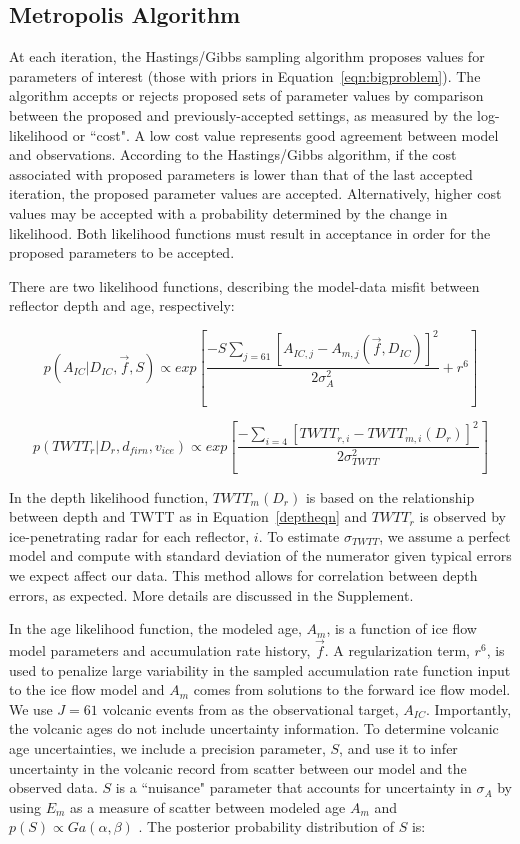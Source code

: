 \subsection{Metropolis Algorithm}\label{metrop}
At each iteration, the Hastings/Gibbs sampling algorithm \citep{hastings1970,gelfand1992} proposes values for parameters of interest (those with priors in Equation~\ref{eqn:bigproblem}). The algorithm accepts or rejects proposed sets of parameter values by comparison between the proposed and previously-accepted settings, as measured by the log-likelihood or ``cost". A low cost value represents good agreement between model and observations. According to the Hastings/Gibbs algorithm, if the cost associated with proposed parameters is lower than that of the last accepted iteration, the proposed parameter values are accepted. Alternatively, higher cost values may be accepted with a probability determined by the change in likelihood. Both likelihood functions must result in acceptance in order for the proposed parameters to be accepted.


There are two likelihood functions, describing the model-data misfit between reflector depth and age, respectively:


\begin{equation}\label{eqn:loglikeage}
p(A_{IC} | D_{IC},\vec{f},S) \propto exp[\frac{-S\sum_{j = 61}[A_{IC,j} - A_{m,j}(\vec{f},D_{IC})]^2}{2\sigma_A^2} + r^6]
\end{equation}

\begin{equation}\label{eqn:loglikedepth}
p(TWTT_r | D_r,d_{firn},v_{ice} ) \propto exp[\frac{-\sum_{i=4}[TWTT_{r,i} - TWTT_{m,i}(D_r)]^2}{2\sigma_{TWTT}^2}]
\end{equation}


In the depth likelihood function, $TWTT_m(D_r)$ is based on the relationship between depth and TWTT as in Equation~\ref{deptheqn} and $TWTT_r$ is observed by ice-penetrating radar for each reflector, $i$. To estimate $\sigma_{TWTT}$, we assume a perfect model and compute with standard deviation of the numerator given typical errors we expect affect our data. This method allows for correlation between depth errors, as expected. More details are discussed in the Supplement.


In the age likelihood function, the modeled age, $A_m$, is a function of ice flow model parameters and accumulation rate history, $\vec{f}$. A regularization term, $r^6$, is used to penalize large variability in the sampled accumulation rate function input to the ice flow model and $A_m$ comes from solutions to the forward ice flow model. We use $J=61$ volcanic events from \citet{hammer1997} as the observational target, $A_{IC}$. Importantly, the volcanic ages do not include uncertainty information. To determine volcanic age uncertainties, we include a precision parameter, $S$, and use it to infer uncertainty in the volcanic record from scatter between our model and the observed data. $S$ is a ``nuisance" parameter that accounts for uncertainty in $\sigma_A$ by using $E_m$ as a measure of scatter between modeled age $A_m$ and $p(S) \propto Ga(\alpha,\beta)$ \citep{jackson&huerta2016}. The posterior probability distribution of $S$ is:

